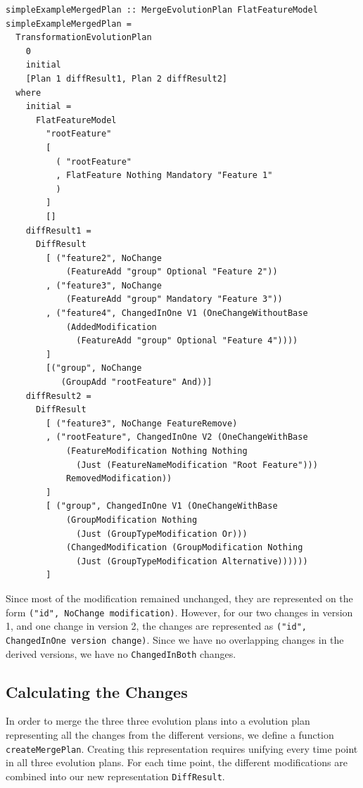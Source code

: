 \documentclass[a4paper,english]{ifimaster}
\begin{document}
\begin{verbatim}
simpleExampleMergedPlan :: MergeEvolutionPlan FlatFeatureModel
simpleExampleMergedPlan =
  TransformationEvolutionPlan
    0
    initial
    [Plan 1 diffResult1, Plan 2 diffResult2]
  where
    initial =
      FlatFeatureModel
        "rootFeature"
        [
          ( "rootFeature"
          , FlatFeature Nothing Mandatory "Feature 1"
          )
        ]
        []
    diffResult1 =
      DiffResult
        [ ("feature2", NoChange 
            (FeatureAdd "group" Optional "Feature 2"))
        , ("feature3", NoChange
            (FeatureAdd "group" Mandatory "Feature 3"))
        , ("feature4", ChangedInOne V1 (OneChangeWithoutBase 
            (AddedModification 
              (FeatureAdd "group" Optional "Feature 4"))))
        ]
        [("group", NoChange 
           (GroupAdd "rootFeature" And))]
    diffResult2 =
      DiffResult
        [ ("feature3", NoChange FeatureRemove)
        , ("rootFeature", ChangedInOne V2 (OneChangeWithBase 
            (FeatureModification Nothing Nothing 
              (Just (FeatureNameModification "Root Feature"))) 
            RemovedModification))
        ]
        [ ("group", ChangedInOne V1 (OneChangeWithBase 
            (GroupModification Nothing 
              (Just (GroupTypeModification Or))) 
            (ChangedModification (GroupModification Nothing 
              (Just (GroupTypeModification Alternative))))))
        ]
\end{verbatim}

Since most of the modification remained unchanged, they are represented on the form \texttt{("id", NoChange modification)}. However, for our two changes in version 1, and one change in version 2, the changes are represented as \texttt{("id", ChangedInOne version change)}. Since we have no overlapping changes in the derived versions, we have no \texttt{ChangedInBoth} changes.

\subsection{Calculating the Changes}%
\label{sub:calculating_the_changes}

In order to merge the three three evolution plans into a evolution plan representing all the changes from the different versions, we define a function \texttt{createMergePlan}. Creating this representation requires unifying every time point in all three evolution plans. For each time point, the different modifications are combined into our new representation \texttt{DiffResult}. 
\end{document}
